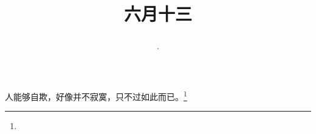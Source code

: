 \title{\date[d=18,m=7,y=2024][year:cn-y,年,month:cn,day:cn,日,·,weekday]·六月十三 }
人能够自欺，好像并不寂寞，只不过如此而已。\footnote{ }

